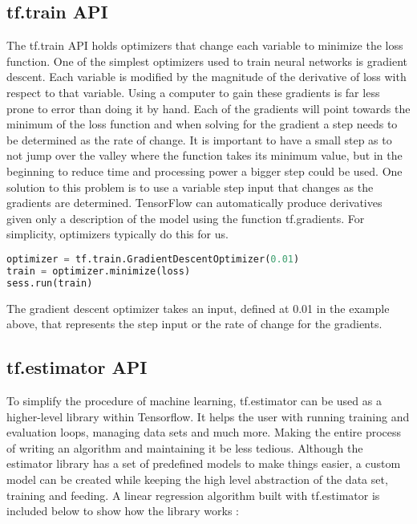 \subsection{tf.train API}
The tf.train API holds optimizers that change each variable to minimize the loss function.
One of the simplest optimizers used to train neural networks is gradient descent.
Each variable is modified by the magnitude of the derivative of loss with respect to that variable.
Using a computer to gain these gradients is far less prone to error than doing it by hand.
Each of the gradients will point towards the minimum of the loss function and when solving for the gradient a step needs to be determined as the rate of change.
It is important to  have a small step as to not jump over the valley where the function takes its minimum value,
but in the beginning to reduce time and processing power a bigger step could be used.
One solution to this problem is to use a variable step input that changes as the gradients are determined.
TensorFlow can automatically produce derivatives given only a description of the model using the function tf.gradients.
For simplicity, optimizers typically do this for us.

\begin{lstlisting}[language=Python, caption=The gradient descent optimizer.]
optimizer = tf.train.GradientDescentOptimizer(0.01)
train = optimizer.minimize(loss)
sess.run(train)
\end{lstlisting}

The gradient descent optimizer takes an input, defined at 0.01 in the example above,
that represents the step input or the rate of change for the gradients.

\subsection{tf.estimator API}
To simplify the procedure of machine learning,
tf.estimator can be used as a higher-level library within Tensorflow.
It helps the user with running training and evaluation loops, managing data sets and much more. 
Making the entire process of writing an algorithm and maintaining it be less tedious.
Although the estimator library has a set of predefined models to make things easier, a custom model can be created while keeping the high
level abstraction of the data set, training and feeding.
A linear regression algorithm built with tf.estimator is included below to show how the library works \cite{Estimator}:

